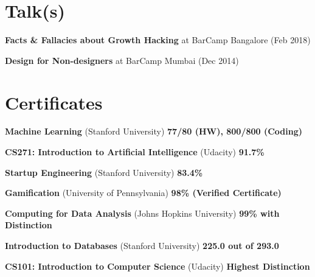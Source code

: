 \documentclass[overlapped,centered]{resume}
\begin{document}
\begin{resume}
	\section{\mysidestyle Talk(s)}
	\begin{list2}
	\item \textbf{Facts \& Fallacies about Growth Hacking} at BarCamp Bangalore (Feb 2018)
	\item \textbf{Design for Non-designers} at BarCamp Mumbai (Dec 2014)
	\end{list2}

    \section{\mysidestyle Certificates}

    \begin{list2}
	\item \textbf{Machine Learning} (Stanford University) \hspace{38mm} \textbf{77/80 (HW), 800/800 (Coding)}
	
	\item \textbf{CS271: Introduction to Artificial Intelligence} (Udacity) \hspace{52mm} \textbf{91.7\%}
	
	\item \textbf{Startup Engineering} (Stanford University) \hspace{78mm} \textbf{83.4\%}
	
    \item \textbf{Gamification} (University of Pennsylvania) \hspace{47mm} \textbf{98\% (Verified Certificate)}
	
	\item \textbf{Computing for Data Analysis} (Johns Hopkins University) \hspace{28mm} \textbf{99\% with Distinction}

	\item \textbf{Introduction to Databases} (Stanford University) \hspace{46mm} \textbf{225.0 out of 293.0}

	\item \textbf{CS101: Introduction to Computer Science} (Udacity) \hspace{34mm} \textbf{Highest Distinction}
	

\end{list2}
\end{resume}
\end{document}
